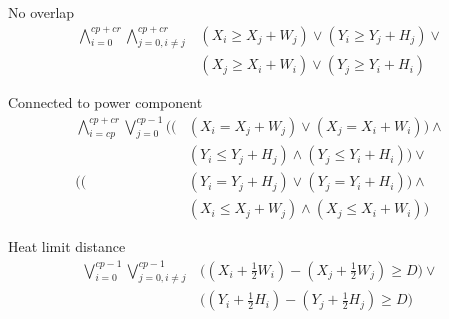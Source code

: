 No overlap
\begin{equation}
  \label{eqn:2_overlap}
  \begin{aligned}
    \bigwedge_{i = 0}^{cp + cr}
      \bigwedge_{j = 0, i \neq j}^{cp + cr}
        &(X_{i} \geq X_{j} + W_{j}) \vee
         (Y_{i} \geq Y_{j} + H_{j}) \vee \\
        &(X_{j} \geq X_{i} + W_{i}) \vee
         (Y_{j} \geq Y_{i} + H_{i})
  \end{aligned}
\end{equation}

Connected to power component
\begin{equation}
  \label{eqn:2_power}
  \begin{aligned}
    \bigwedge_{i = cp}^{cp + cr}
      \bigvee_{j = 0}^{cp - 1}
        \Bigg(
          \Big(&
            (X_{i} = X_{j} + W_{j}) \vee
            (X_{j} = X_{i} + W_{i})
          \Big) \wedge \\&
          (Y_{i} \leq Y_{j} + H_{j}) \wedge
          (Y_{j} \leq Y_{i} + H_{i})
        \Bigg) \vee \\
        \Bigg(
          \Big(&
            (Y_{i} = Y_{j} + H_{j}) \vee
            (Y_{j} = Y_{i} + H_{i})
          \Big) \wedge \\&
          (X_{i} \leq X_{j} + W_{j}) \wedge
          (X_{j} \leq X_{i} + W_{i})
        \Bigg)
    \end{aligned}
\end{equation}

Heat limit distance
\begin{equation}
  \label{eqn:2_dist}
  \begin{aligned}
    \bigvee_{i = 0}^{cp - 1}
      \bigvee_{j = 0, i \neq j}^{cp - 1}
        &\Big((X_{i} + \frac{1}{2}W_{i}) - (X_{j} + \frac{1}{2}W_{j}) \geq D\Big) \vee \\
        &\Big((Y_{i} + \frac{1}{2}H_{i}) - (Y_{j} + \frac{1}{2}H_{j}) \geq D\Big)
  \end{aligned}
\end{equation}

